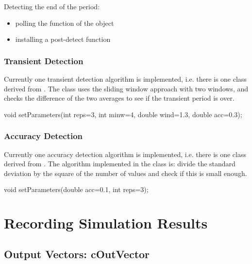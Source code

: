 Detecting the end of the period:
\begin{itemize}
\item{polling the  function of the object}
\item{installing a post-detect function}
\end{itemize}


\subsubsection{Transient Detection}
\label{sec:sim-lib:transient-detection}

Currently one transient detection algorithm
is implemented, i.e. there is one class derived from
. The  class
uses the sliding window approach with two windows, and checks the
difference of the two averages to see if the transient period is over.

\begin{cpp}
void setParameters(int reps=3,
                   int minw=4,
                   double wind=1.3,
                   double acc=0.3);
\end{cpp}

\subsubsection{Accuracy Detection}
\label{sec:sim-lib:accuracy-detection}


Currently one accuracy detection algorithm
is implemented, i.e.  there is one class derived from
. The algorithm implemented in the
 class is: divide the standard deviation by the
square of the number of values and check if this is small enough.

\begin{cpp}
void setParameters(double acc=0.1, int reps=3);
\end{cpp}




\section{Recording Simulation Results}
\label{sec:sim-lib:result-recording}

\subsection{Output Vectors: cOutVector}
\label{sec:sim-lib:coutvector}

